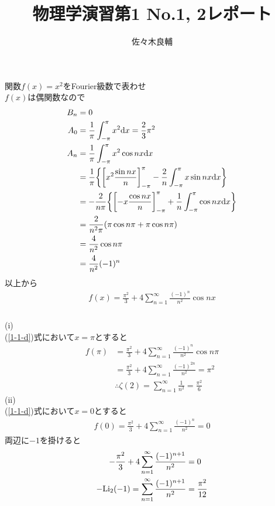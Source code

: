 \documentclass[uplatex,a4j,11pt]{jsarticle}
\newcommand{\setsections}[3]{
\setcounter{section}{#1}
\setcounter{subsection}{#2}
\setcounter{subsubsection}{#3}
}
\begin{document}
\title{物理学演習第1 No.1, 2レポート}
\author{佐々木良輔}
\date{}
\maketitle
\setsections{1}{1}{3}
\subsubsection{}
関数$f(x)=x^2$をFourier級数で表わせ\\
$f(x)$は偶関数なので
\begin{align*}
  B_n&=0\\
  A_0&=\frac{1}{\pi}\int^{\pi}_{-\pi}x^2{\rm d}x=\frac{2}{3}\pi^2\\
  A_n&=\frac{1}{\pi}\int_{-\pi}^{\pi}x^2\cos nx{\rm d}x\\
  &=\frac{1}{\pi}\biggl\{\biggl[x^2\frac{\sin nx}{n}\biggr]^{\pi}_{-\pi}-\frac{2}{n}\int^{\pi}_{-\pi}x\sin nx{\rm d}x\biggr\}\\
  &=-\frac{2}{n\pi}\biggl\{\biggl[-x\frac{\cos nx}{n}\biggr]^{\pi}_{-\pi}+\frac{1}{n}\int^{\pi}_{-\pi}\cos nx{\rm d}x\biggr\}\\
  &=\frac{2}{n^2\pi}(\pi\cos n\pi+\pi\cos n\pi)\\
  &=\frac{4}{n^2}\cos n\pi\\
  &=\frac{4}{n^2}(-1)^n
\end{align*}
以上から
\begin{align}
  \label{1-1-d}
  f(x)=\frac{\pi^2}{3}+4\sum^{\infty}_{n=1}\frac{(-1)^n}{n^2}\cos nx
\end{align}
\subsubsection{}
\noindent(i)\\
(\ref{1-1-d})式において$x=\pi$とすると
\begin{align*}
  f(\pi)&=\frac{\pi^2}{3}+4\sum^{\infty}_{n=1}\frac{(-1)^n}{n^2}\cos n\pi\\
  &=\frac{\pi^2}{3}+4\sum^{\infty}_{n=1}\frac{(-1)^{2n}}{n^2}=\pi^2\\
  &\therefore\zeta(2)=\sum^{\infty}_{n=1}\frac{1}{n^2}=\frac{\pi^2}{6}
\end{align*}
(ii)\\
(\ref{1-1-d})式において$x=0$とすると
\begin{align*}
  f(0)=\frac{\pi^2}{3}+4\sum^{\infty}_{n=1}\frac{(-1)^n}{n^2}=0
\end{align*}
両辺に$-1$を掛けると
\begin{align*}
  -\frac{\pi^2}{3}+4\sum^{\infty}_{n=1}\frac{(-1)^{n+1}}{n^2}&=0\\
  -{\rm Li}_2(-1)=\sum^{\infty}_{n=1}\frac{(-1)^{n+1}}{n^2}&=\frac{\pi^2}{12}
\end{align*}
\setsections{2}{3}{3}
\end{document}
